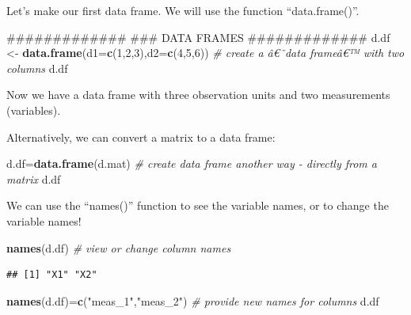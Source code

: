 \documentclass[]{article}
\newenvironment{Shaded}{\begin{snugshade}}{\end{snugshade}}
\newcommand{\KeywordTok}[1]{\textcolor[rgb]{0.13,0.29,0.53}{\textbf{#1}}}
\newcommand{\DataTypeTok}[1]{\textcolor[rgb]{0.13,0.29,0.53}{#1}}
\newcommand{\DecValTok}[1]{\textcolor[rgb]{0.00,0.00,0.81}{#1}}
\newcommand{\StringTok}[1]{\textcolor[rgb]{0.31,0.60,0.02}{#1}}
\newcommand{\CommentTok}[1]{\textcolor[rgb]{0.56,0.35,0.01}{\textit{#1}}}
\newcommand{\NormalTok}[1]{#1}
\begin{document}
Let's make our first data frame. We will use the function
``data.frame()''.

\begin{Shaded}
\begin{Highlighting}[]
\NormalTok{#############}
\NormalTok{### DATA FRAMES}
\NormalTok{#############}
\NormalTok{d.df <-}\StringTok{ }\KeywordTok{data.frame}\NormalTok{(}\DataTypeTok{d1=}\KeywordTok{c}\NormalTok{(}\DecValTok{1}\NormalTok{,}\DecValTok{2}\NormalTok{,}\DecValTok{3}\NormalTok{),}\DataTypeTok{d2=}\KeywordTok{c}\NormalTok{(}\DecValTok{4}\NormalTok{,}\DecValTok{5}\NormalTok{,}\DecValTok{6}\NormalTok{))        }\CommentTok{# create a â€˜data frameâ€™ with two columns}
\NormalTok{d.df}
\end{Highlighting}
\end{Shaded}

Now we have a data frame with three observation units and two
measurements (variables).

Alternatively, we can convert a matrix to a data frame:

\begin{Shaded}
\begin{Highlighting}[]
\NormalTok{d.df=}\KeywordTok{data.frame}\NormalTok{(d.mat)        }\CommentTok{# create data frame another way - directly from a matrix}
\NormalTok{d.df}
\end{Highlighting}
\end{Shaded}

We can use the ``names()'' function to see the variable names, or to
change the variable names!

\begin{Shaded}
\begin{Highlighting}[]
\KeywordTok{names}\NormalTok{(d.df)          }\CommentTok{# view or change column names}
\end{Highlighting}
\end{Shaded}

\begin{verbatim}
## [1] "X1" "X2"
\end{verbatim}

\begin{Shaded}
\begin{Highlighting}[]
\KeywordTok{names}\NormalTok{(d.df)=}\KeywordTok{c}\NormalTok{(}\StringTok{"meas_1"}\NormalTok{,}\StringTok{"meas_2"}\NormalTok{)        }\CommentTok{# provide new names for columns}
\NormalTok{d.df}
\end{Highlighting}
\end{Shaded}
\end{document}
